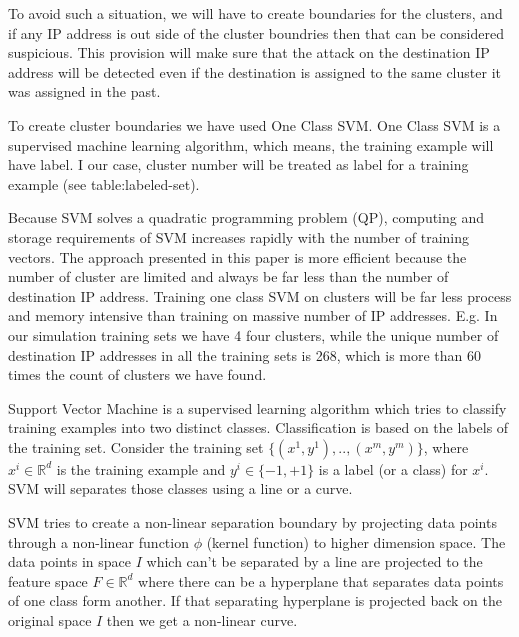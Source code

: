\documentclass[12pt,oneside,a4paper]{article}
\begin{document}
To avoid such a situation, we will have to create boundaries for the clusters, and if any IP address is out side of the cluster boundries then that can be considered suspicious. This provision will make sure that the attack on the destination IP address will be detected even if the destination is assigned to the same cluster it was assigned in the past.

To create cluster boundaries we have used One Class SVM. One Class SVM is a supervised machine learning algorithm, which means, the training example will have label. I our case, cluster number will be treated as label for a training example (see table:labeled-set).

Because SVM solves a quadratic programming problem (QP), computing and storage requirements of SVM increases rapidly with the number of training vectors. The approach presented in this paper is more efficient because the number of cluster are limited and always be far less than the number of destination IP address. Training one class SVM on clusters will be far less process and memory intensive than training on massive number of IP addresses. E.g. In our simulation training sets we have 4 four clusters, while the unique number of destination IP addresses in all the training sets is 268, which is more than 60 times the count of clusters we have found.

Support Vector Machine is a supervised learning algorithm which tries to classify training examples into two distinct classes. Classification is based on the labels of the training set.
Consider the training set $\{(x^{1},y^{1}), .., (x^{m},y^{m})\}$, where $x^{i} \in \mathbb{R}^d$ is the training example and $y^{i} \in \{-1, +1\}$ is a label (or a class) for $x^{i}$. SVM will separates those classes using a line or a curve.

SVM tries to create a non-linear separation boundary by projecting data points through a non-linear function $\phi$ (kernel function) to higher dimension space. The data points in space $I$ which can't be separated by a line are projected to the feature space $F \in \mathbb{R}^d$ where there can be a hyperplane that separates data points of one class form another. If that separating hyperplane is projected back on the original space $I$ then we get a non-linear curve.\cite{svm}
\end{document}
